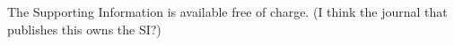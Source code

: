 \documentclass[journal=jacsat,manuscript=article]{achemso}
\newcommand{\alltodo}[1]{{\color{cyan} (#1)}}
\begin{document}
\begin{suppinfo}
The Supporting Information is available free of charge. \alltodo{I think the journal that publishes this owns the SI?}

\end{suppinfo}



\end{document}
